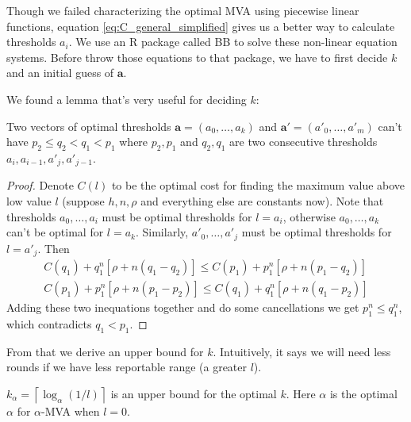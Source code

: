 Though we failed characterizing the optimal MVA using piecewise linear
functions, equation \ref{eq:C_general_simplified} gives us a better way to
calculate thresholds $a_i$. We use an R package called BB \cite{Varadhan2009:BB} to
solve these non-linear equation systems. Before throw those equations to that
package, we have to first decide $k$ and an initial guess of $\boldsymbol a$.

We found a lemma that's very useful for deciding $k$:

\begin{lemma}\label{lemma:thresholds}
Two vectors of optimal thresholds $\boldsymbol a = (a_0, \ldots, a_k)$ and
$\boldsymbol a' = (a'_0, \ldots, a'_m)$ can't have $p_2 \leq q_2 < q_1 < p_1$
where $p_2, p_1$ and $q_2, q_1$ are two consecutive thresholds $a_i, a_{i-1},
a'_j, a'_{j-1}$.
\end{lemma}

\begin{proof}
Denote $C(l)$ to be the optimal cost for finding the maximum value above low
value $l$ (suppose $h, n, \rho$ and everything else are constants now). Note
that thresholds $a_0, \ldots, a_i$ must be optimal thresholds for $l = a_i$,
otherwise $a_0, \ldots, a_k$ can't be optimal for $l = a_k$.  Similarly,
$a'_0, \ldots, a'_j$ must be optimal thresholds for $l = a'_j$.  Then 
\begin{align*}
  C(q_1) + q_1^n [\rho+n(q_1-q_2)] \leq C(p_1) + p_1^n [\rho + n(p_1-q_2)]\\
  C(p_1) + p_1^n [\rho+n(p_1-p_2)] \leq C(q_1) + q_1^n [\rho + n(q_1-p_2)]
\end{align*}
Adding these two inequations together and do some cancellations we get
$p_1^n \leq q_1^n$, which contradicts $q_1 < p_1$.
\end{proof}

From that we derive an upper bound for $k$. Intuitively, it says we will need
less rounds if we have less reportable range (a greater $l$).

\begin{lemma}\label{lemma:k_upper}
$k_\alpha = \left\lceil \log_{\alpha} \left(1/l\right) \right\rceil$ is an
upper bound for the optimal $k$. Here $\alpha$ is the optimal $\alpha$ for
$\alpha$-MVA when $l = 0$. 
\end{lemma}

